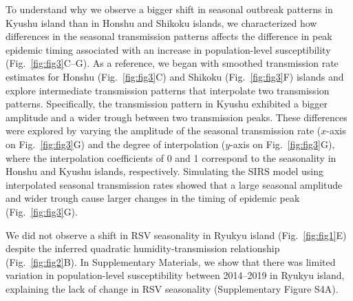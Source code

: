 \documentclass[12pt]{article}
\newcommand{\fref}[1]{Fig.~\ref{fig:#1}}
\begin{document}
To understand why we observe a bigger shift in seasonal outbreak patterns in Kyushu island than in Honshu and Shikoku islands, we characterized how differences in the seasonal transmission patterns affects the difference in peak epidemic timing associated with an increase in population-level susceptibility (\fref{fig3}C--G).
As a reference, we began with smoothed transmission rate estimates for Honshu (\fref{fig3}C) and Shikoku (\fref{fig3}F) islands and explore intermediate transmission patterns that interpolate two transmission patterns.
Specifically, the transmission pattern in Kyushu exhibited a bigger amplitude and a wider trough between two transmission peaks.
These differences were explored by varying the amplitude of the seasonal transmission rate ($x$-axis on \fref{fig3}G) and the degree of interpolation ($y$-axis on \fref{fig3}G), where the interpolation coefficients of 0 and 1 correspond to the seasonality in Honshu and Kyushu islands, respectively.
Simulating the SIRS model using interpolated seasonal transmission rates showed that a large seasonal amplitude and wider trough cause larger changes in the timing of epidemic peak (\fref{fig3}G). 

We did not observe a shift in RSV seasonality in Ryukyu island (\fref{fig1}E) despite the inferred quadratic humidity-transmission relationship (\fref{fig2}B).
In Supplementary Materials, we show that there was limited variation in population-level susceptibility between 2014--2019 in Ryukyu island, explaining the lack of change in RSV seasonality (Supplementary Figure S4A).
\end{document}
